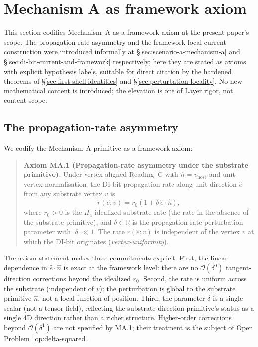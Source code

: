 \documentclass[11pt,letterpaper]{article}
\newcommand{\vhost}{v_{\text{host}}}
\newcommand{\bigO}[1]{\mathcal{O}(#1)}
\begin{document}
\section{Mechanism A as framework axiom}
\label{sec:mechanism-a}


This section codifies Mechanism~A as a framework axiom at the present paper's scope. The propagation-rate asymmetry and the framework-local current construction were introduced informally at \S\ref{sec:scenario-a-mechanism-a} and \S\ref{sec:di-bit-current-and-framework} respectively; here they are stated as axioms with explicit hypothesis labels, suitable for direct citation by the hardened theorems of \S\ref{sec:first-shell-identities} and \S\ref{sec:perturbation-locality}. No new mathematical content is introduced; the elevation is one of Layer rigor, not content scope.

\subsection{The propagation-rate asymmetry}
\label{sec:propagation-rate-asymmetry}

We codify the Mechanism~A primitive as a framework axiom:

\begin{quote}
\textbf{Axiom MA.1 (Propagation-rate asymmetry under the substrate primitive)}. Under vertex-aligned Reading~C with $\hat{n} = \vhost$ and unit-vertex normalisation, the DI-bit propagation rate along unit-direction $\hat{e}$ from any substrate vertex $v$ is
\[
r(\hat{e}; v) = r_0 \left(1 + \delta \, \hat{e} \cdot \hat{n}\right),
\]
where $r_0 > 0$ is the $H_4$-idealized substrate rate (the rate in the absence of the substrate primitive), and $\delta \in \mathbb{R}$ is the propagation-rate perturbation parameter with $|\delta| \ll 1$. The rate $r(\hat{e}; v)$ is independent of the vertex $v$ at which the DI-bit originates (\emph{vertex-uniformity}).
\end{quote}

The axiom statement makes three commitments explicit. First, the linear dependence in $\hat{e} \cdot \hat{n}$ is exact at the framework level: there are no $\bigO{\delta^0}$ tangent-direction corrections beyond the idealized $r_0$. Second, the rate is uniform across the substrate (independent of $v$): the perturbation is global to the substrate primitive $\hat{n}$, not a local function of position. Third, the parameter $\delta$ is a single scalar (not a tensor field), reflecting the substrate-direction-primitive's status as a single 4D direction rather than a richer structure. Higher-order corrections beyond $\bigO{\delta^1}$ are not specified by MA.1; their treatment is the subject of Open Problem~\ref{op:delta-squared}.
\end{document}
